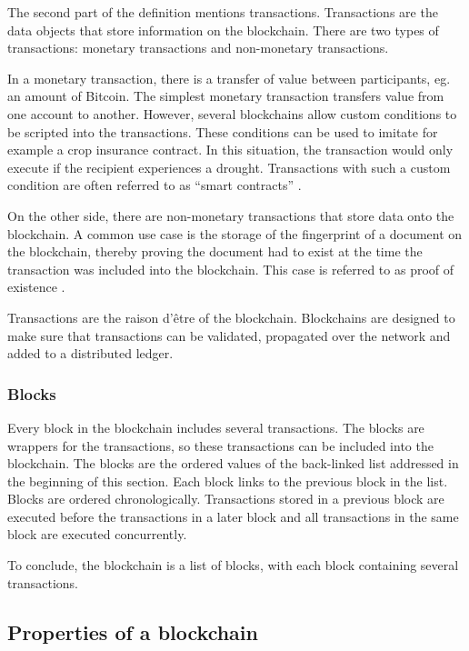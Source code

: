 The second part of the definition mentions transactions. Transactions are the data objects that store information on the blockchain. There are two types of transactions: monetary transactions and non-monetary transactions.

In a monetary transaction, there is a transfer of value between participants, eg. an amount of Bitcoin. The simplest monetary transaction transfers value from one account to another. However, several blockchains allow custom conditions to be scripted into the transactions. These conditions can be used to imitate for example a crop insurance contract. In this situation, the transaction would only execute if the recipient experiences a drought. Transactions with such a custom condition are often referred to as ``smart contracts'' \cite{Ethereum-whitepaper}.

On the other side, there are non-monetary transactions that store data onto the blockchain. A common use case is the storage of the fingerprint of a document on the blockchain, thereby proving the document had to exist at the time the transaction was included into the blockchain. This case is referred to as proof of existence \cite{proof-of-existence}.

Transactions are the raison d'\^{e}tre of the blockchain. Blockchains are designed to make sure that transactions can be validated, propagated over the network and added to a distributed ledger.

\subsubsection{Blocks}

Every block in the blockchain includes several transactions. The blocks are wrappers for the transactions, so these transactions can be included into the blockchain. The blocks are the ordered values of the back-linked list addressed in the beginning of this section. Each block links to the previous block in the list. Blocks are ordered chronologically. Transactions stored in a previous block are executed before the transactions in a later block and all transactions in the same block are executed concurrently.

To conclude, the blockchain is a list of blocks, with each block containing several transactions.

\subsection{Properties of a blockchain}

